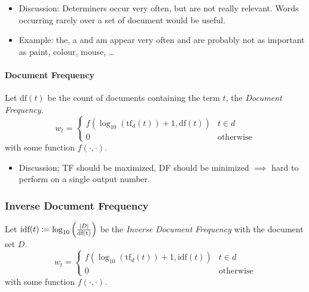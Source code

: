                 \begin{itemize}
                	\item Discussion: Determiners occur very often, but are not really relevant. Words occurring rarely over a set of document would be useful.
                	\item Example: the, a and am appear very often and are probably not as important as paint, colour, mouse, \dots
                \end{itemize}

            \paragraph{Document Frequency} %
            	Let \( \text{df}(t) \) be the count of documents containing the term \(t\), the \textit{Document Frequency}.
                \begin{equation*}
                    w_t =
                    	\begin{cases}
	                    	f(\log_{10}(\text{tf}_d(t)) + 1, \text{df}(t)) & t \in d \\
	                    	0 & \text{otherwise}
                    	\end{cases}
                \end{equation*}
                with some function \( f(\cdot, \cdot) \).
                
                \begin{itemize}
                	\item Discussion; TF should be maximized, DF should be minimized \(\implies\) hard to perform on a single output number.
                \end{itemize}

            \subsubsection{Inverse Document Frequency} %
            	Let \( \text{idf}(t) \coloneqq \log_{10}\Big(\frac{\abs{D}}{\text{df(t)}}\Big) \) be the \textit{Inverse Document Frequency} with the document set \(D\).
           		\begin{equation*}
               		w_t =
               			\begin{cases}
	               			f(\log_{10}(\text{tf}_d(t)) + 1, \text{idf}(t)) & t \in d \\
	               			0 & \text{otherwise}
               			\end{cases}
           		\end{equation*}
           		with some function \( f(\cdot, \cdot) \).

